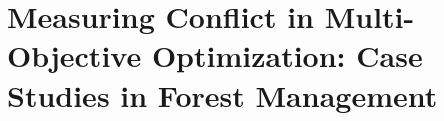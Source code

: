  
\chapter{Measuring Conflict in Multi-Objective Optimization: Case Studies in Forest Management}





